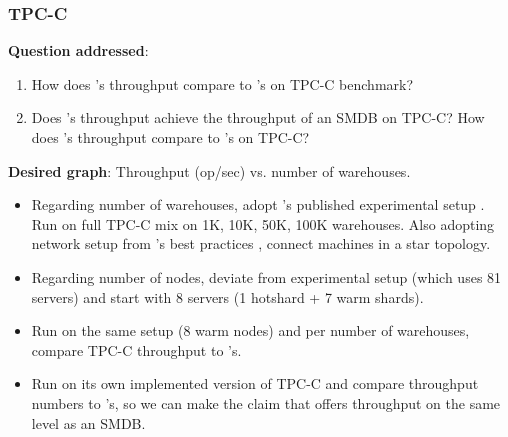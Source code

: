 \subsubsection{TPC-C}
\label{sec:tpcc}

\textbf{Question addressed}:
\begin{enumerate}
    \item How does \name{}'s throughput compare to \dsdb{}'s on TPC-C benchmark?
    \item Does \name{}'s throughput achieve the throughput of an SMDB on TPC-C? How does \name{}'s throughput compare to \smdb{}'s on TPC-C?
\end{enumerate}
\textbf{Desired graph}: Throughput (op/sec) vs. number of warehouses.
\begin{itemize}
    \item Regarding number of warehouses, adopt \dsdb{}'s published experimental setup \cite{cockroachdb_experimental}. Run \name{} on full TPC-C mix on 1K, 10K, 50K, 100K warehouses. Also adopting network setup from \dsdb{}'s best practices \cite{cockroachdb_best}, connect machines in a star topology.
    \item Regarding number of nodes, deviate from \dsdb{} experimental setup (which uses 81 servers) and start with 8 servers (1 hotshard + 7 warm shards).
    \item Run \dsdb{} on the same setup (8 warm nodes) and per number of warehouses, compare TPC-C throughput to \name{}'s.
    \item Run \smdb{} on its own implemented version of TPC-C and compare throughput numbers to \name{}'s, so we can make the claim that \name{} offers throughput on the same level as an SMDB.
\end{itemize}

